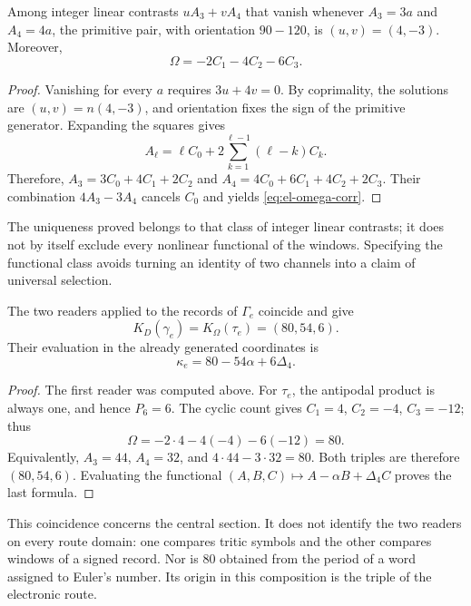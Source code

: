 \begin{lemma}
Among integer linear contrasts \(uA_3+vA_4\) that vanish
whenever \(A_3=3a\) and \(A_4=4a\), the primitive pair, with
orientation \(90-120\), is \((u,v)=(4,-3)\). Moreover,
\begin{equation}
 \Omega=-2C_1-4C_2-6C_3.
 \label{eq:el-omega-corr}
\end{equation}
\end{lemma}
\begin{proof}
Vanishing for every \(a\) requires \(3u+4v=0\). By coprimality,
the solutions are \((u,v)=n(4,-3)\), and orientation fixes the sign
of the primitive generator. Expanding the squares gives
\[
 A_\ell=\ell C_0+2\sum_{k=1}^{\ell-1}(\ell-k)C_k.
\]
Therefore,
\(A_3=3C_0+4C_1+2C_2\) and
\(A_4=4C_0+6C_1+4C_2+2C_3\). Their combination \(4A_3-3A_4\)
cancels \(C_0\) and yields \eqref{eq:el-omega-corr}.
\end{proof}

The uniqueness proved belongs to that class of integer linear
contrasts; it does not by itself exclude every nonlinear functional of the windows.
Specifying the functional class avoids turning an identity
of two channels into a claim of universal selection.

\begin{theorem}
The two readers applied to the records of \(\Gamma_e\)
coincide and give
\begin{equation}
 K_D(\gamma_e)=K_\Omega(\tau_e)=(80,54,6).
 \label{eq:el-triple}
\end{equation}
Their evaluation in the already generated coordinates is
\begin{equation}
 \kappa_e=80-54\alpha+6\Delta_4.
 \label{eq:el-kappa}
\end{equation}
\end{theorem}
\begin{proof}
The first reader was computed above. For \(\tau_e\), the antipodal
product is always one, and hence \(P_6=6\). The cyclic count gives
\(C_1=4\), \(C_2=-4\), \(C_3=-12\); thus
\[
 \Omega=-2\cdot4-4(-4)-6(-12)=80.
\]
Equivalently, \(A_3=44\), \(A_4=32\), and
\(4\cdot44-3\cdot32=80\). Both triples are therefore
\((80,54,6)\). Evaluating the functional
\((A,B,C)\mapsto A-\alpha B+\Delta_4C\) proves the last formula.
\end{proof}

This coincidence concerns the central section. It does not identify
the two readers on every route domain: one compares tritic
symbols and the other compares windows of a signed record. Nor is
\(80\) obtained from the period of a word assigned to Euler's
number. Its origin in this composition is the triple of the electronic
route.

